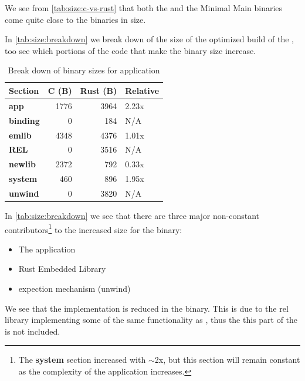We see from \autoref{tab:size:c-vs-rust} that both the {\cg} and the Minimal Main  {\rust} binaries come quite close to the {\C} binaries in size.

In \autoref{tab:size:breakdown} we break down of the size of the optimized build of the {\tracker}, too see which portions of the {\rust} code that make the binary size increase.

\begin{table}[H]
  \centering
  \begin{tabular}{l|r|r|l}
    \textbf{Section}      & \textbf{C (B)} & \textbf{Rust (B)} & \textbf{Relative} \\
    \hline
    \textbf{app}          & 1776 & 3964 & 2.23x \\
    \textbf{binding}      & 0    & 184  & N/A  \\
    \textbf{emlib}        & 4348 & 4376 & 1.01x \\
    \textbf{REL}          & 0    & 3516 & N/A  \\
    \textbf{newlib}       & 2372 & 792  & 0.33x \\
    \textbf{system}       & 460  & 896  & 1.95x \\
    \textbf{unwind}       & 0    & 3820 & N/A  \\
    \hline
  \end{tabular}
  \caption{Break down of binary sizes for {\tracker} application}
  \label{tab:size:breakdown}
\end{table}

In \autoref{tab:size:breakdown} we see that there are three major non-constant contributors\footnote{The \textbf{system} section increased with $\sim$2x, but this section will remain constant as the complexity of the application increases.} to the increased size for the {\rust} binary:

\begin{itemize}
\item The application
\item Rust Embedded Library
\item {\rust} expection mechanism (unwind)
\end{itemize}

We see that the  implementation is reduced in the {\rust} binary.
This is due to the \gls{rel} library implementing some of the same functionality as , thus the this part of the  is not included.


